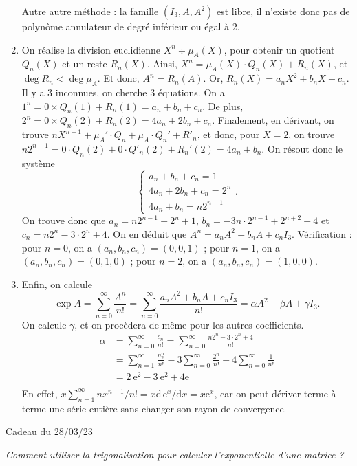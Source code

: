 \documentclass[a4paper]{article}
\begin{document}
\begin{enumerate}
			Autre autre méthode : la famille $(I_3, A, A^2)$ est libre, il n'existe donc pas de polynôme annulateur de degré inférieur ou égal à $2$.
		\item On réalise la division euclidienne $X^n \div \mu_A(X)$, pour obtenir un quotient $Q_n(X)$ et un reste $R_n(X)$.
			Ainsi, $X^n = \mu_A(X) \cdot Q_n(X) + R_n(X)$, et $\deg R_n < \deg \mu_A$.
			Et donc, $A^n = R_n(A)$.
			Or, $R_n(X) = a_n X^2 + b_n X + c_n$.
			Il y a 3 inconnues, on cherche 3 équations.
			On a $1^n = 0 \times Q_n(1) + R_n(1) = a_n + b_n + c_n$.
			De plus, $2^n = 0 \times Q_n(2) + R_n(2) = 4a_n + 2b_n + c_n$.
			Finalement, en dérivant, on trouve $n X^{n-1} + \mu_A' \cdot Q_n  + \mu_A \cdot Q_n' + R'_n$, et donc, pour $X = 2$, on trouve $n 2^{n-1} = 0 \cdot Q_n(2) + 0 \cdot Q'_n(2) + R_n'(2) = 4a_n + b_n$.
			On résout donc le système
			\[
				\begin{cases}
					a_n + b_n + c_n = 1\\
					4a_n + 2b_n + c_n = 2^n\\
					4a_n + b_n = n 2^{n-1}
				\end{cases}
			.\]
			On trouve donc que $a_n = n 2^{n-1} - 2^n + 1$, $b_n = -3n \cdot 2^{n-1} + 2^{n+2} - 4$ et $c_n = n 2^n - 3\cdot 2^n + 4$.
			On en déduit que $A^n = a_n A^2 + b_n A + c_n I_3$.
			Vérification : pour $n = 0$, on a $(a_n, b_n, c_n) = (0, 0, 1)$ ; pour $n = 1$, on a $(a_n, b_n, c_n) = (0, 1, 0)$ ; pour $n = 2$, on a $(a_n, b_n, c_n) = (1, 0, 0)$.
		\item Enfin, on calcule \[
				\exp A = \sum_{n=0}^\infty \frac{A^n}{n!} = \sum_{n=0}^\infty \frac{a_n A^2 + b_n A + c_n I_3}{n!} = \alpha A^2 + \beta A + \gamma I_3
			.\] On calcule $\gamma$, et on procèdera de même pour les autres coefficients.
			\begin{align*}
				\alpha &= \sum_{n=0}^\infty \frac{c_n}{n!} = \sum_{n=0}^\infty \frac{n 2^n - 3 \cdot 2^n + 4}{n!}\\
				&= \sum_{n=1}^\infty \frac{n_2^{n}}{n!} - 3 \sum_{n=0}^\infty \frac{2^n}{n!} + 4 \sum_{n=0 }^\infty \frac{1}{n!} \\
				&= 2\: \mathrm{e}^2 - 3\:\mathrm{e}^2  + 4 \mathrm{e} \\
			\end{align*}
			En effet, $x \sum_{n=1}^\infty n x^{n-1} / n! = x \mathrm{d}\,\mathrm{e}^x/\mathrm{d}x = x \mathrm{e}^x$, car on peut dériver terme à terme une série entière sans changer son rayon de convergence.
	\end{enumerate}
	\clearpage
	\centerline{\LARGE Cadeau du 28/03/23}
	\centerline{\itshape Comment utiliser la trigonalisation pour calculer l'exponentielle d'une matrice ?}
\end{document}

